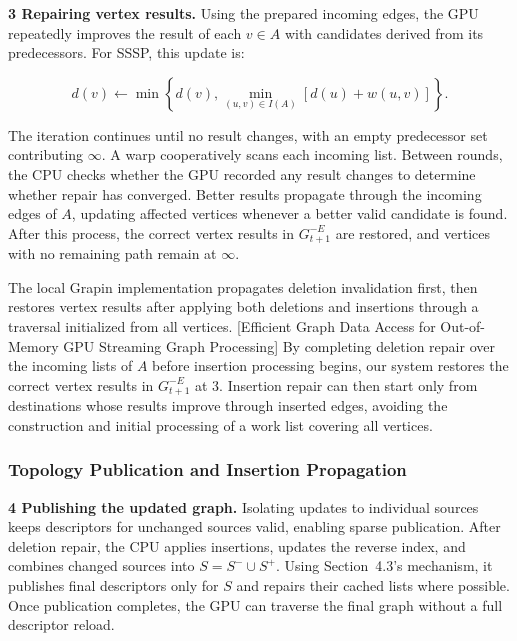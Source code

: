 \textbf{3 Repairing vertex results.} Using the prepared incoming edges, the GPU repeatedly improves the result of each $v\in A$ with candidates derived from its predecessors. For SSSP, this update is:

\begin{equation}
d(v)\leftarrow\min\left\{d(v),
\min_{(u,v)\in I(A)}[d(u)+w(u,v)]\right\}.
\tag{5.2}
\end{equation}

The iteration continues until no result changes, with an empty predecessor set contributing $\infty$. A warp cooperatively scans each incoming list. Between rounds, the CPU checks whether the GPU recorded any result changes to determine whether repair has converged. Better results propagate through the incoming edges of $A$, updating affected vertices whenever a better valid candidate is found. After this process, the correct vertex results in $G_{t+1}^{-E}$ are restored, and vertices with no remaining path remain at $\infty$.

The local Grapin implementation propagates deletion invalidation first, then restores vertex results after applying both deletions and insertions through a traversal initialized from all vertices. [Efficient Graph Data Access for Out-of-Memory GPU Streaming Graph Processing] By completing deletion repair over the incoming lists of $A$ before insertion processing begins, our system restores the correct vertex results in $G_{t+1}^{-E}$ at 3. Insertion repair can then start only from destinations whose results improve through inserted edges, avoiding the construction and initial processing of a work list covering all vertices.

\subsubsection{Topology Publication and Insertion Propagation}
\label{sec:insertion-propagation}


\textbf{4 Publishing the updated graph.} Isolating updates to individual sources keeps descriptors for unchanged sources valid, enabling sparse publication. After deletion repair, the CPU applies insertions, updates the reverse index, and combines changed sources into $S=S^-\cup S^+$. Using Section~4.3's mechanism, it publishes final descriptors only for $S$ and repairs their cached lists where possible. Once publication completes, the GPU can traverse the final graph without a full descriptor reload.

